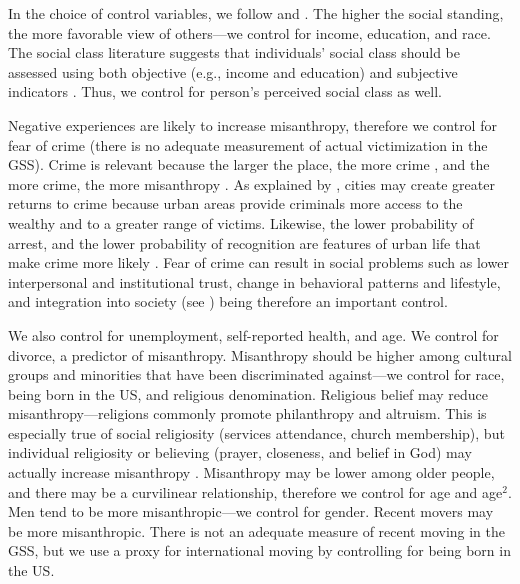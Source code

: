 \documentclass[11pt, letterpaper]{article}
\begin{document}
\begin{spacing}{1.4}
In the choice of control variables, we follow \citet{welch07} and  \citet{smith97}.
The higher the social standing, the more favorable view of others---we
control for income, education, and race. The social class literature suggests that
individuals' social class should be assessed  using both objective (e.g.,
income and education) and subjective indicators \citep[e.g.,][]{kraus09}. %
Thus, we control for person's perceived social class as well. 

Negative experiences are likely to increase misanthropy, therefore we control
for fear of crime (there is no adequate measurement of actual victimization in
the GSS). Crime is relevant because the larger the place, the more crime
\citep{bettencourt10b,wirth38,white77}, and the more crime, the more misanthropy
\citep{wilson85}. As explained by \citet{glaeser1999}, cities may create greater
returns to crime because urban areas provide criminals more access to the wealthy and to
a greater range of victims. Likewise, the lower probability of
arrest, and the lower probability of recognition are features of urban life that
make crime more likely  \citep{glaeser1999}. %
 Fear of crime can result in social problems such as lower interpersonal and institutional trust, change in behavioral patterns and lifestyle, and integration into society (see \citet{krulichova2018life}) being therefore an important control. 

We also control for unemployment, self-reported health, and age. We control for
divorce, a predictor of misanthropy.  Misanthropy should be higher among
cultural groups and minorities that have been discriminated against---we control
for race, being born in the US, and religious denomination. Religious belief may
reduce misanthropy---religions commonly promote philanthropy and altruism. This
is especially true of social religiosity (services attendance, church
membership), but individual religiosity or believing (prayer, closeness, and
belief in God) may actually increase misanthropy \citep{aok20rel}. Misanthropy
may be lower among older people, and there may be a curvilinear relationship,
therefore we control for age and age$^2$. Men tend to be more misanthropic---we
control for gender. Recent movers may be more misanthropic. There is not an
adequate measure of recent moving in the GSS, but we use a proxy for international moving by controlling for being born in the US.


\end{spacing}
\end{document}
